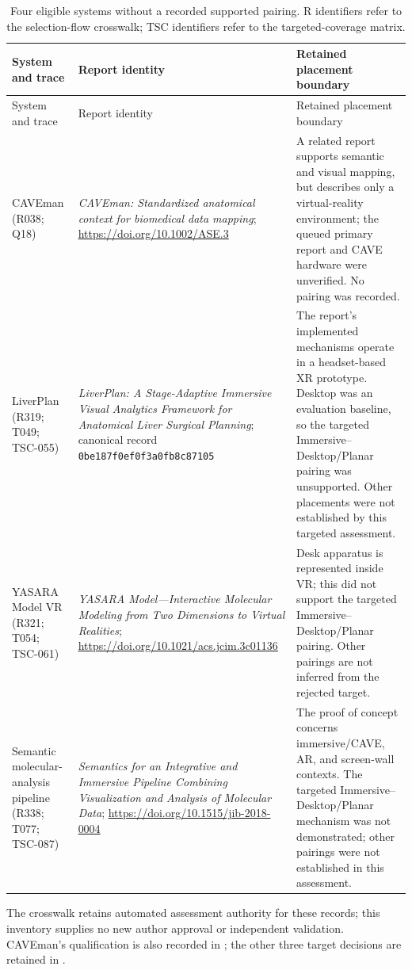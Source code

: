 \documentclass[11pt]{article}
\begin{document}
\begin{longtable}{p{}p{}p{}}
\caption{Four eligible systems without a recorded supported pairing. R identifiers refer to the selection-flow crosswalk; TSC identifiers refer to the targeted-coverage matrix.}\label{tab:eligible-unmapped}\\
\toprule System and trace & Report identity & Retained placement boundary \\\midrule
\endfirsthead
\toprule System and trace & Report identity & Retained placement boundary \\\midrule
\endhead
CAVEman (R038; Q18) & \emph{CAVEman: Standardized anatomical context for biomedical data mapping}; \url{https://doi.org/10.1002/ASE.3} & A related report supports semantic and visual mapping, but describes only a virtual-reality environment; the queued primary report and CAVE hardware were unverified. No pairing was recorded. \\
LiverPlan (R319; T049; TSC-055) & \emph{LiverPlan: A Stage-Adaptive Immersive Visual Analytics Framework for Anatomical Liver Surgical Planning}; canonical record \texttt{0be187f0ef0f3a0fb8c87105} & The report's implemented mechanisms operate in a headset-based XR prototype. Desktop was an evaluation baseline, so the targeted Immersive--Desktop/Planar pairing was unsupported. Other placements were not established by this targeted assessment. \\
YASARA Model VR (R321; T054; TSC-061) & \emph{YASARA Model---Interactive Molecular Modeling from Two Dimensions to Virtual Realities}; \url{https://doi.org/10.1021/acs.jcim.3c01136} & Desk apparatus is represented inside VR; this did not support the targeted Immersive--Desktop/Planar pairing. Other pairings are not inferred from the rejected target. \\
Semantic molecular-analysis pipeline (R338; T077; TSC-087) & \emph{Semantics for an Integrative and Immersive Pipeline Combining Visualization and Analysis of Molecular Data}; \url{https://doi.org/10.1515/jib-2018-0004} & The proof of concept concerns immersive/CAVE, AR, and screen-wall contexts. The targeted Immersive--Desktop/Planar mechanism was not demonstrated; other pairings were not established in this assessment. \\
\bottomrule
\end{longtable}
The crosswalk retains automated assessment authority for these records; this inventory supplies no new author approval or independent validation. CAVEman's qualification is also recorded in ; the other three target decisions are retained in .


\end{document}
